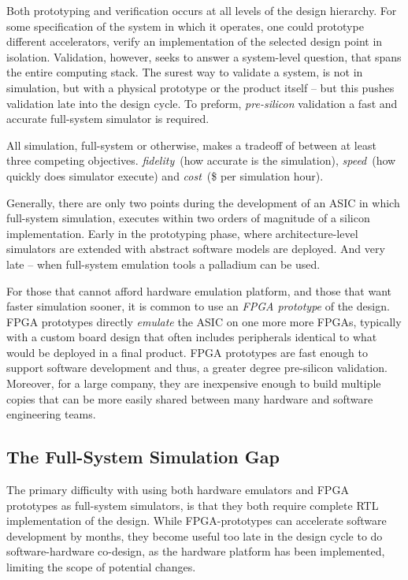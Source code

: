 Both prototyping and verification occurs at all levels of the design hierarchy.
For some specification of the system in which it operates, one could prototype
different accelerators, verify an implementation of the selected design point
in isolation. Validation, however, seeks to answer a system-level question,
that spans the entire computing stack.  The surest way to validate a system, is
not in simulation, but with a physical prototype or the product itself -- but
this pushes validation late into the design cycle. To preform,
\emph{pre-silicon} validation a fast and accurate full-system simulator is
required.

All simulation, full-system or otherwise, makes a tradeoff of between at least
three competing objectives.  \emph{fidelity}~(how accurate is the simulation),
\emph{speed}~(how quickly does simulator execute) and \emph{cost}~(\$ per
simulation hour). 

Generally, there are only two points during the development of an ASIC in which
full-system simulation, executes within two orders of magnitude of a silicon
implementation. Early in the prototyping phase, where architecture-level
simulators are extended with abstract software models are deployed. And very
late -- when full-system emulation tools a palladium can be used.

For those that cannot afford hardware emulation platform, and those
that want faster simulation sooner, it is common to use an \emph{FPGA
prototype} of the design. FPGA prototypes directly \emph{emulate} the ASIC on
one more more FPGAs, typically with a custom board design that often includes
peripherals identical to what would be deployed in a final product. FPGA
prototypes are fast enough to support software development and thus, a greater
degree pre-silicon validation. Moreover, for a large company, they are
inexpensive enough to build multiple copies that can be more easily shared
between many hardware and software engineering teams.

\subsection{The Full-System Simulation Gap}

The primary difficulty with using both hardware emulators and FPGA prototypes
as full-system simulators, is that they both require complete RTL
implementation of the design. While FPGA-prototypes can accelerate software
development by months, they become useful too late in the design cycle to do
software-hardware co-design, as the hardware platform has been implemented,
limiting the scope of potential changes.

